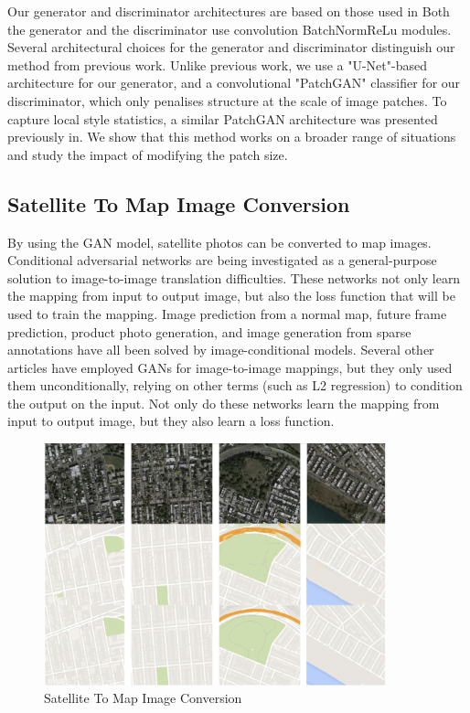 Our generator and discriminator architectures are based on those used in Both the generator and the discriminator use convolution BatchNormReLu modules.
Several architectural choices for the generator and discriminator distinguish our method from previous work. Unlike previous work, we use a "U-Net"-based architecture for our generator, and a convolutional "PatchGAN" classifier for our discriminator, which only penalises structure at the scale of image patches. To capture local style statistics, a similar PatchGAN architecture was presented previously in. We show that this method works on a broader range of situations and study the impact of modifying the patch size.




\par  


\subsection{Satellite To Map Image Conversion}

\par  By using the GAN model, satellite photos can be converted to map images. Conditional adversarial networks are being investigated as a general-purpose solution to image-to-image translation difficulties. These networks not only learn the mapping from input to output image, but also the loss function that will be used to train the mapping. Image prediction from a normal map, future frame prediction, product photo generation, and image generation from sparse annotations have all been solved by image-conditional models. Several other articles have employed GANs for image-to-image mappings, but they only used them unconditionally, relying on other terms (such as L2 regression) to condition the output on the input. Not only do these networks learn the mapping from input to output image, but they also learn a loss function.


	\begin{figure}[h!]
    \centering
    \includegraphics[width=\linewidth,height=7cm]{figures/2.png}
    \caption{ Satellite To Map Image Conversion }
    \label{fig:GAN model}
\end{figure}



